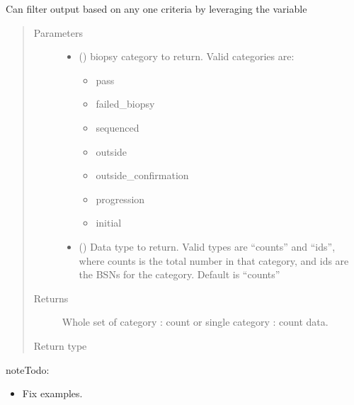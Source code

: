 \documentclass[letterpaper,10pt,english]{sphinxmanual}
\begin{document}
\begin{fulllineitems}
\begin{fulllineitems}
Can filter output based on any one criteria by leveraging the 
variable
\begin{quote}\begin{description}
\item[{Parameters}] \leavevmode\begin{itemize}
\item {} 
 () \textendash{} 
biopsy category to return. Valid categories are:
\begin{itemize}
\item {} 
pass

\item {} 
failed\_biopsy

\item {} 
sequenced

\item {} 
outside

\item {} 
outside\_confirmation

\item {} 
progression

\item {} 
initial

\end{itemize}


\item {} 
 () \textendash{} Data type to return. Valid types are “counts” and
“ids”, where counts is the total number in that category, and
ids are the BSNs for the category. Default is “counts”

\end{itemize}

\item[{Returns}] \leavevmode
Whole set of category : count or single category : count data.

\item[{Return type}] \leavevmode
{}

\end{description}\end{quote}

\begin{sphinxadmonition}{note}{\label{matchbox_api_utils:index-0}Todo:}\begin{itemize}
\item {} 
Fix examples.


\end{itemize}
\end{sphinxadmonition}
\end{fulllineitems}
\end{fulllineitems}
\end{document}
